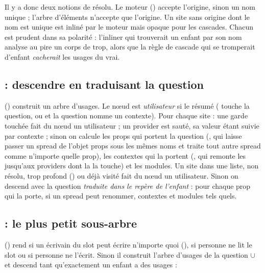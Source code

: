 \begin{piege}
Il y a donc deux notions de \og résolu\fg. Le moteur () accepte l'origine,
sinon un nom unique ; l'arbre d'éléments n'accepte que l'origine. Un site sans origine dont le
nom est unique est inliné par le moteur mais opaque pour les cascades. Chacun est prudent dans
sa polarité : l'inliner qui trouverait un enfant par son nom analyse au pire un corps de trop,
alors que la règle de cascade qui se tromperait d'enfant \emph{cacherait} les usages du vrai.
\end{piege}

\subsection{ : descendre en traduisant la question}

 () construit un arbre
d'usages. Le nœud est \emph{utilisateur} si le résumé  ( touche la
question, ou  et la question nomme un contexte). Pour chaque site : une garde
touchée fait du nœud un utilisateur ; un provider est sauté, sa valeur étant suivie par contexte ;
sinon on calcule les props qui portent la question (, qui laisse passer un spread
de l'objet props sous les mêmes noms et traite tout autre spread comme \og n'importe quelle
prop\fg), les contextes qui la portent (, qui remonte les 
jusqu'aux providers dont la  la touche) et les modules. Un site dans une liste, non
résolu, trop profond () ou déjà visité fait du nœud un utilisateur. Sinon on
descend avec la question \emph{traduite dans le repère de l'enfant} :  pour chaque
prop qui la porte,  si un spread peut renommer, contextes et modules tels quels.

\subsection{ : le plus petit sous-arbre}

 () rend 
si un écrivain du slot peut écrire n'importe quoi (), si personne ne lit le
slot ou si personne ne l'écrit. Sinon il construit l'arbre d'usages de la question
 $\cup$  et descend tant qu'exactement un enfant a
des usages :

